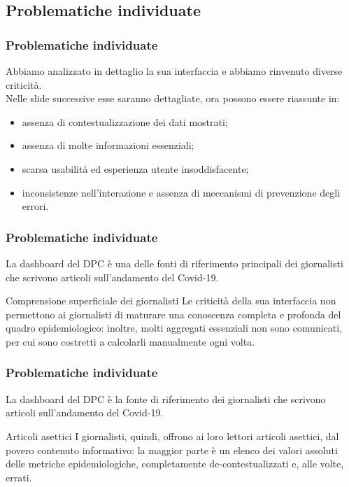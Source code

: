 \documentclass[../../main.tex]{subfiles}
\begin{document}
\subsection{Problematiche individuate}

\begin{frame}
    \frametitle{Problematiche individuate}
    Abbiamo analizzato in dettaglio la sua interfaccia e abbiamo rinvenuto diverse criticità.\\
    Nelle slide successive esse saranno dettagliate, ora possono essere riassunte in:
    \begin{itemize}
        \item<1-> assenza di contestualizzazione dei dati mostrati;
        \item<2-> assenza di molte informazioni essenziali;
        \item<3-> scarsa usabilità ed esperienza utente insoddisfacente;
        \item<4-> inconsistenze nell'interazione e assenza di meccanismi di prevenzione degli errori.
    \end{itemize}

\end{frame}

\begin{frame}
    \frametitle{Problematiche individuate}
    La dashboard del DPC è una delle fonti di riferimento principali dei giornalisti che scrivono articoli sull'andamento del Covid-19.
    \vspace{-50pt}
    \begin{alertblock}{Comprensione superficiale dei giornalisti}
        Le criticità della sua interfaccia non permettono ai giornalisti di maturare una conoscenza completa e profonda del quadro epidemiologico: inoltre, molti aggregati essenziali non sono comunicati, per cui sono costretti a calcolarli manualmente ogni volta.
    \end{alertblock}

\end{frame}

\begin{frame}
    \frametitle{Problematiche individuate}
    La dashboard del DPC è la fonte di riferimento dei giornalisti che scrivono articoli sull'andamento del Covid-19.
    \vspace{-50pt}
    \begin{alertblock}{Articoli asettici}
        I giornalisti, quindi, offrono ai loro lettori articoli asettici, dal povero contenuto informativo: la maggior parte è un elenco dei valori assoluti delle metriche epidemiologiche, completamente de-contestualizzati e, alle volte, errati.
    \end{alertblock}

\end{frame}
\end{document}
